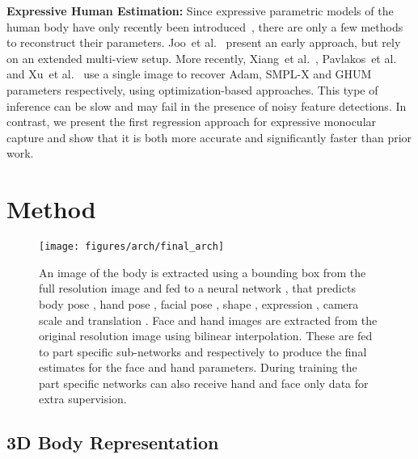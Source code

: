 \documentclass[runningheads]{llncs}
\newcommand{\smplx}{\mbox{SMPL-X}\xspace}
\newcommand{\adam}{\mbox{Adam}\xspace}
\newcommand{\ghum}{\mbox{GHUM}\xspace}
\newcommand{\threeD}{3D\xspace}
\newcommand{\etal}{et al.\xspace}
\begin{document}
\textbf{Expressive Human Estimation:}
Since expressive
parametric models of the human
body have only recently been introduced~\cite{joo2018total,Pavlakos_2019_CVPR,romero2017embodied,Xu_2020_CVPR},
there are only a few methods to reconstruct their parameters.
Joo~\etal~\cite{joo2018total} present an early approach,
but rely on an extended multi-view setup.
More recently, Xiang~\etal~\cite{Xiang_2019_CVPR},
Pavlakos~\etal~\cite{Pavlakos_2019_CVPR} and Xu~\etal~\cite{Xu_2020_CVPR}
use a single image to recover
\adam, \smplx and \ghum parameters respectively,
using optimization-based approaches.
This type of inference can be slow and
may fail in the presence of noisy feature detections.
In contrast, we present the first
regression approach for expressive monocular capture and show that it
is both more accurate and significantly faster than prior work.
 \section{Method}
\label{sec:method}

\begin{figure}[t!]
    \centering      	   \texttt{[image: figures/arch/final\_arch]}
        \caption{
            An image of the body is extracted using a bounding box from the full
            resolution image and fed to a neural network , that predicts
            body pose , hand
            pose , facial pose , shape
            , expression , camera scale  and translation
            . Face and hand images are extracted from the original
            resolution image using bilinear interpolation. These are fed to part
            specific sub-networks  and  respectively to produce the
            final estimates for the face and hand parameters.
            During training the part specific networks can also receive hand and face only data
            for extra supervision.
        }
        \label{fig:arch}
    \end{figure}
 
\subsection{\threeD Body Representation}
\label{sec:technical_body_model}
\end{document}

